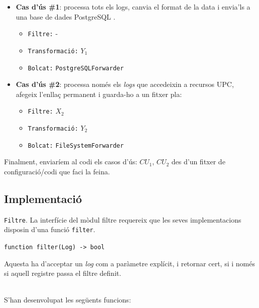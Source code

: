 \begin{itemize}
    \item \textbf{Cas d'ús \#1}: processa tots els logs, canvia el format de la data i envia'ls a una base de dades PostgreSQL .
    \begin{itemize}
        \item \texttt{Filtre:} -
        \item \texttt{Transformació:} \(Y_1\)
        \item \texttt{Bolcat:} \texttt{PostgreSQLForwarder}
    \end{itemize}
    \item \textbf{Cas d'ús \#2}: processa només els \textit{\gls{log}s} que accedeixin a recursos UPC, afegeix l’enllaç permanent i guarda-ho a un fitxer pla:
    \begin{itemize}
        \item \texttt{Filtre:} \(X_2\)
        \item \texttt{Transformació:} \(Y_2\)
        \item \texttt{Bolcat:} \texttt{FileSystemForwarder}
    \end{itemize}
\end{itemize}

\noindent
Finalment, enviaríem al codi els casos d’ús: \(CU_1\), \(CU_2\) des d'un fitxer de configuració/codi que faci la feina.

\clearpage

\subsection{Implementació}\label{subsec:log-implementation}

\noindent
\texttt{Filtre}.
La interfície del mòdul filtre requereix que les seves implementacions disposin d'una funció \texttt{filter}.
\begin{center}
    \texttt{function filter(Log) -> bool}
\end{center}
Aquesta ha d'acceptar un \textit{\gls{log}} com a paràmetre explícit, i retornar cert, si i només si aquell registre passa el filtre definit.

\noindent \\
S'han desenvolupat les següents funcions:

